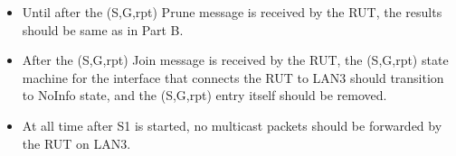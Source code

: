 \documentclass[11pt]{report}
\begin{document}
\begin{itemize}

  \item Until after the (S,G,rpt) Prune message is received by the RUT, the
  results should be same as in Part B.

  \item After the (S,G,rpt) Join message is received by the RUT,
  the (S,G,rpt) state machine for the interface that connects the RUT to
  LAN3 should transition to NoInfo state, and the (S,G,rpt) entry itself
  should be removed.

  \item At all time after S1 is started, no multicast packets should be
  forwarded by the RUT on LAN3.

\end{itemize}

\end{document}
